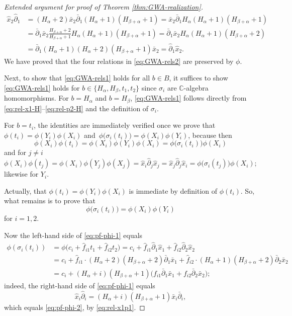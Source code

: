 \documentclass[10pt,a4paper]{article}
\numberwithin{equation}{section}
\begin{document}
\begin{proof}[Extended argument for proof of Theorem \ref{thm:GWA-realization}]
	\begin{align*}
		\hat{x}_2\hat{\partial}_1&=(H_\alpha+2)\bar{x}_2\bar{\partial}_1(H_\alpha+1)(H_{\beta+\alpha}+1)=\bar{x}_2\bar{\partial}_1 H_\alpha (H_\alpha+1)(H_{\beta+\alpha}+1)\\
		&=\bar{\partial}_1\bar{x}_2\frac{H_{\beta+\alpha}+2}{H_{\beta+\alpha}+1}H_\alpha (H_\alpha+1)(H_{\beta+\alpha}+1)=
		\bar{\partial}_1\bar{x}_2 H_\alpha(H_\alpha+1)(H_{\beta+\alpha}+2)\\
		&=\bar{\partial}_1(H_\alpha+1)(H_\alpha+2)(H_{\beta+\alpha}+1)\bar{x}_2=\hat{\partial}_1\hat{x}_2.
	\end{align*}
	We have proved that the four relations in \eqref{eq:GWA-rels2} are preserved by $\phi$.
	
	Next, to show that \eqref{eq:GWA-rels1} holds for all $b\in B$, it suffices to show \eqref{eq:GWA-rels1} holds for $b\in\{H_\alpha, H_\beta, t_1, t_2\}$ since $\sigma_i$ are $\mathbb{C}$-algebra homomorphisms.
	For $b=H_\alpha$ and $b=H_\beta$, \eqref{eq:GWA-rels1} follows directly from \eqref{eq:rel-x1-H}--\eqref{eq:rel-p2-H} and the definition of $\sigma_i$.
	
	For $b=t_i$, the identities are immediately verified once we prove that $\phi(t_i)=\phi(Y_i)\phi(X_i)$ and~${\phi\big(\sigma_i(t_i)\big)=\phi(X_i)\phi(Y_i)}$, because then
	\[\phi(X_i)\phi(t_i)=\phi(X_i)\phi(Y_i)\phi(X_i)=\phi\big(\sigma_i(t_i)\big)\phi(X_i)\]
	and for $j\neq i$
	\[ \phi(X_i)\phi(t_j)=\phi(X_i)\phi(Y_j)\phi(X_j)=\hat{x}_i\hat{\partial}_j\hat{x}_j=\hat{x}_j\hat{\partial}_j\hat{x}_i=\phi\big(\sigma_i(t_j)\big)\phi(X_i);\]
	likewise for $Y_i$.
	
	Actually, that $\phi(t_i)=\phi(Y_i)\phi(X_i)$ is immediate by definition of $\phi(t_i)$. So, what remains is to prove that
	\begin{equation}\label{eq:pf-phi-1}
		\phi\big(\sigma_i(t_i))=\phi(X_i)\phi(Y_i)
	\end{equation}
	for $i=1,2$.
	
	Now the left-hand side of \eqref{eq:pf-phi-1} equals
	\begin{align}
		\phi(\sigma_i(t_i))&=\phi\bigl(c_i+\hat f_{i1}t_1+\hat f_{i2}t_2\bigr)=c_i+\hat f_{i1}\hat{\partial}_1\hat{x}_1+\hat f_{i2}\hat{\partial}_2\hat{x}_2 \nonumber\\
		&=c_i+\hat f_{i1}\cdot(H_\alpha+2)(H_{\beta+\alpha}+2)\bar{\partial}_1\bar{x}_1+\hat f_{i2}\cdot (H_\alpha+1)(H_{\beta+\alpha}+2)\bar{\partial}_2\bar{x}_2\nonumber\\
		&=c_i+(H_\alpha+i)(H_{\beta+\alpha}+1)\bigl(f_{i1}\bar{\partial}_1\bar{x}_1+f_{i2}\bar{\partial}_2\bar{x}_2\bigr);\label{eq:pf-phi-2}
	\end{align}
	indeed, the right-hand side of \eqref{eq:pf-phi-1} equals
	\[\hat{x}_i\hat{\partial}_i=(H_\alpha+i)(H_{\beta+\alpha}+1)\bar{x}_i\bar{\partial}_i,\]
	which equals \eqref{eq:pf-phi-2}, by \eqref{eq:rel-x1p1}.
	

\end{proof}
\end{document}
